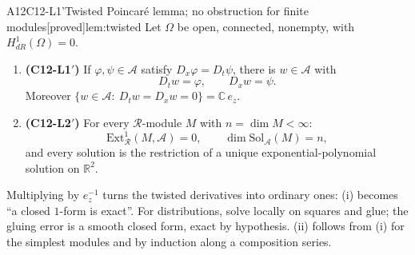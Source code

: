 \documentclass[11pt,a4paper,oneside]{report}
\newcommand{\badge}[2]{\textcolor{#1}{\textsf{\footnotesize[#2]}}}
\newcommand{\proved}{\badge{cC}{proved}}
\newcommand{\R}{\mathbb{R}}\newcommand{\C}{\mathbb{C}}\newcommand{\N}{\mathbb{N}}\newcommand{\Z}{\mathbb{Z}}\newcommand{\Q}{\mathbb{Q}}
\newcommand{\ring}{\mathcal{R}}
\DeclareMathOperator{\dimc}{dim}
\newenvironment{dimcard}[5]{\par\Needspace{12\baselineskip}\begin{dimcardbox}{#1}{#2}{#3}{#4}{#5}}{\end{dimcardbox}}
\begin{document}
\begin{dimcard}{A12}{C12-L1'}{Twisted Poincar\'e lemma; no obstruction for finite modules}{\proved}{lem:twisted}
\label{dim:C12-L1p}%
Let $\Omega$ be open, connected, nonempty, with $H^1_{dR}(\Omega)=0$.
\begin{enumerate}[label=(\roman*)]
\item \textbf{(C12-L1$'$)} If $\varphi,\psi\in\mathcal A$ satisfy $D_x\varphi=D_t\psi$, there is $w\in\mathcal A$ with
\[
D_tw=\varphi,\qquad D_xw=\psi .
\]
Moreover $\{w\in\mathcal A:\ D_tw=D_xw=0\}=\C\,e_z$.
\item \textbf{(C12-L2$'$)} For every $\ring$-module $M$ with $n=\dimc M<\infty$:
\[
\mathrm{Ext}^1_\ring(M,\mathcal A)=0,\qquad \dimc\mathrm{Sol}_{\mathcal A}(M)=n,
\]
and every solution is the restriction of a unique exponential-polynomial solution on $\R^2$.
\end{enumerate}
\end{dimcard}

\begin{proofidea}
Multiplying by $e_z^{-1}$ turns the twisted derivatives into ordinary ones: (i) becomes ``a closed $1$-form is exact''. For distributions, solve locally on squares and glue; the gluing error is a smooth closed form, exact by hypothesis. (ii) follows from (i) for the simplest modules and by induction along a composition series.
\end{proofidea}
\end{document}
